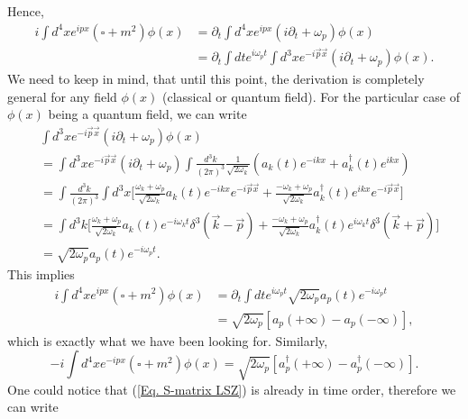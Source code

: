 \documentclass[11pt]{article}
\theoremstyle{definition}
\begin{document}
Hence,
\begin{equation}
    \begin{aligned}
        i\int d^4x e^{ipx}(\square+m^2)\phi(x) &= \partial_t\int d^4x e^{ipx}(i\partial_t+\omega_p)\phi(x) \\
        &= \partial_t \int dt e^{i\omega_pt} \int d^3x e^{-i\vec{p}\vec{x}}(i\partial_t+\omega_p)\phi(x).
    \end{aligned}
\end{equation}
We need to keep in mind, that until this point, the derivation is completely general for any field $\phi(x)$ (classical or quantum field). For the particular case of $\phi(x)$ being a quantum field, we can write
\begin{equation}
    \begin{aligned}
        &\int d^3x e^{-i\vec{p}\vec{x}}(i\partial_t+\omega_p)\phi(x)\\
        &=\int d^3x e^{-i\vec{p}\vec{x}}(i\partial_t+\omega_p) \int \frac{d^3k}{(2\pi)^3}\frac{1}{\sqrt{2\omega_k}}(a_k(t)e^{-ikx} + a_k^\dagger(t) e^{ikx})\\
        &=\int \frac{d^3k}{(2\pi)^3} \int d^3x \biggr[ \frac{\omega_k+\omega_p}{\sqrt{2\omega_k}} a_k(t) e^{-ikx} e^{-i\vec{p}\vec{x}} + \frac{-\omega_k+\omega_p}{\sqrt{2\omega_k}} a_k^\dagger(t) e^{ikx} e^{-i\vec{p}\vec{x}} \biggr] \\
        &=\int d^3k \biggr[ \frac{\omega_k+\omega_p}{\sqrt{2\omega_k}} a_k(t) e^{-i\omega_kt} \delta^3(\vec{k}-\vec{p}) + \frac{-\omega_k+\omega_p}{\sqrt{2\omega_k}} a_k^\dagger(t) e^{i\omega_kt} \delta^3(\vec{k}+\vec{p}) \biggr]\\
        &=\sqrt{2\omega_p}a_p(t)e^{-i\omega_pt}.
    \end{aligned}
\end{equation}
This implies
\begin{equation}
\begin{aligned}
    i\int d^4x e^{ipx}(\square+m^2)\phi(x) &= \partial_t \int dt e^{i\omega_pt}\sqrt{2\omega_p}a_p(t)e^{-i\omega_pt} \\
    &= \sqrt{2\omega_p} [a_p(+\infty) - a_p(-\infty)],
\end{aligned}
\end{equation}
which is exactly what we have been looking for. Similarly,
\begin{equation}
    -i\int d^4x e^{-ipx}(\square+m^2)\phi(x) = \sqrt{2\omega_p} [a_p^\dagger(+\infty) - a_p^\dagger(-\infty)].
\end{equation}
One could notice that (\ref{Eq. S-matrix LSZ}) is already in time order, therefore we can write
\end{document}

